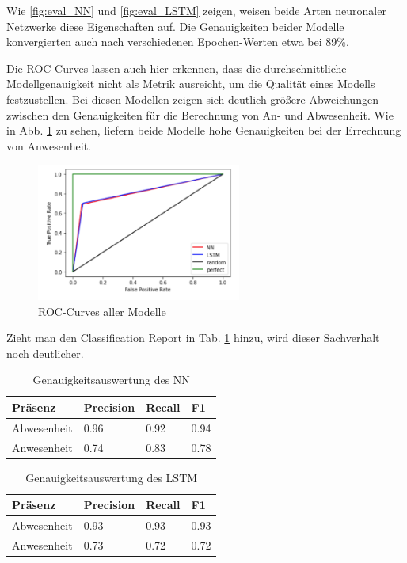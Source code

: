 Wie \ref{fig:eval_NN} und \ref{fig:eval_LSTM} zeigen, weisen beide Arten neuronaler Netzwerke diese Eigenschaften auf. Die Genauigkeiten beider Modelle
konvergierten auch nach verschiedenen Epochen-Werten etwa bei 89\%.

\newpage
Die ROC-Curves lassen auch hier erkennen, dass die durchschnittliche Modellgenauigkeit nicht als Metrik ausreicht, um
die Qualität eines Modells festzustellen. Bei diesen Modellen zeigen sich deutlich größere Abweichungen zwischen
den Genauigkeiten für die Berechnung von An- und Abwesenheit. Wie in Abb. \ref{fig:Roc_nn} zu sehen, liefern
beide Modelle hohe Genauigkeiten bei der Errechnung von Anwesenheit.

\begin{figure}[!h]
    \centering
    \includegraphics[width=0.6\textwidth]{pic/roc_nn.png}
    \caption{ROC-Curves aller Modelle}
    \label{fig:Roc_nn}
\end{figure}

Zieht man den Classification Report in Tab. \ref{tab:nn} hinzu, wird dieser Sachverhalt noch deutlicher.


\begin{table}[h]
    \centering
    \caption{Genauigkeitsauswertung des NN}
    \begin{tabular}{|p{2.5cm}||p{1.8cm}|p{1.5cm}|p{1.5cm}|}
        \hline
        \hfill Präsenz&\hfill Precision &\hfill Recall &\hfill F1\\
        \hline
        \hline
        \hfill Abwesenheit&\hfill 0.96&\hfill 0.92&\hfill 0.94\\
        \hfill Anwesenheit&\hfill 0.74&\hfill 0.83&\hfill 0.78\\
        \hline
    \end{tabular}          
    \label{tab:nn}
\end{table}
\begin{table}[h]
    \centering
    \caption{Genauigkeitsauswertung des LSTM}
    \begin{tabular}{|p{2.5cm}||p{1.8cm}|p{1.5cm}|p{1.5cm}|}
        \hline
        \hfill Präsenz&\hfill Precision &\hfill Recall &\hfill F1\\
        \hline
        \hline
        \hfill Abwesenheit&\hfill 0.93&\hfill 0.93&\hfill 0.93\\
        \hfill Anwesenheit&\hfill 0.73&\hfill 0.72&\hfill 0.72\\
        \hline
    \end{tabular}          
    \label{tab:LSTM}
\end{table}

